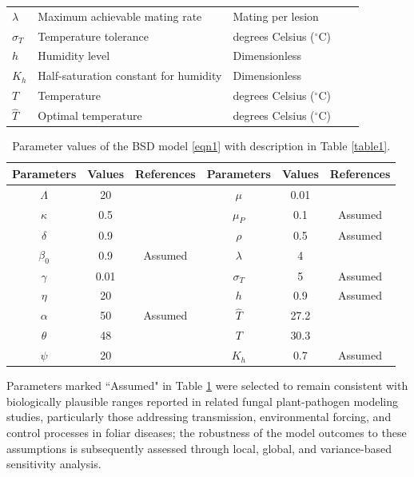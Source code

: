 \documentclass[11pt]{article}
\numberwithin{equation}{section}
\begin{document}
\begin{table}[!ht]
\begin{tabular}{lllll@{}}
        $\lambda$  & Maximum achievable mating rate & Mating per lesion\\
        $\sigma_T$ & Temperature tolerance & degrees Celsius ($^{\circ}$C)\\
        $h$        & Humidity level & Dimensionless\\
        $K_h$      & Half-saturation constant for humidity & Dimensionless\\
        $T$  & Temperature & degrees Celsius ($^{\circ}$C)\\
        $\hat{T}$  & Optimal temperature & degrees Celsius ($^{\circ}$C)\\
        \bottomrule
    \end{tabular}
\end{table}

\begin{table}[ht]
	\centering
	\caption{Parameter values of the BSD model \eqref{eqn1} with description in Table \ref{table1}.}
	\begin{tabular}{ccc||ccc}
		\hline
		Parameters&Values&References & Parameters&Values&References\\
		\hline
		  \midrule
            $\Lambda$ & 20 & \cite{agouanet} & $\mu$ & 0.01 & \cite{ravigne} \\
            $\kappa$ & 0.5 & \cite{agouanet} & $\mu_P$ & 0.1 & Assumed\\
            $\delta$ & 0.9 & \cite{agouanet} & $\rho$ & 0.5 & Assumed \\
            $\beta_0$ & 0.9 & Assumed & $\lambda$ & 4 & \cite{agouanet}\\
            $\gamma$ & 0.01 & \cite{ravigne} & $\sigma_T$ & 5    & Assumed\\
            $\eta$ & 20   & \cite{ravigne} & $h$        & 0.9  & Assumed\\
            $\alpha$ & 50  & Assumed & $\hat{T}$  & 27.2 & \cite{bebber}\\
            $\theta$ & 48   & \cite{agouanet} & $T$ & 30.3 & \cite{bebber}\\
            $\psi$ & 20   & \cite{agouanet} & $K_h$      & 0.7  & Assumed \\
		\hline
	\end{tabular}
	\label{table2}
\end{table}
Parameters marked ``Assumed" in Table \ref{table2} were selected to remain consistent with biologically plausible ranges reported in related fungal plant-pathogen modeling studies, particularly those addressing transmission, environmental forcing, and control processes in foliar diseases; the robustness of the model outcomes to these assumptions is subsequently assessed through local, global, and variance-based sensitivity analysis.
\end{document}
